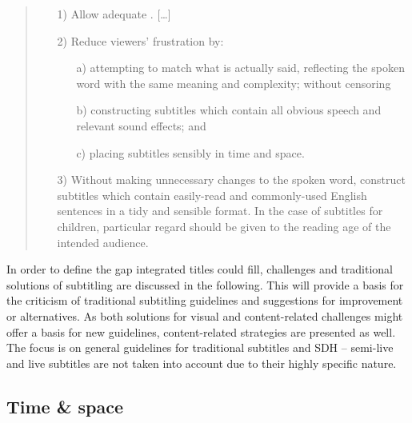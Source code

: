 \begin{quote}
\begin{itemize}
\item[1)] Allow adequate . […]
\item[2)] Reduce viewers' frustration by:
\begin{itemize}
\item[a)] attempting to match what is actually said, reflecting the spoken word with the same meaning and complexity; without censoring
\item[b)] constructing subtitles which contain all obvious speech and relevant sound effects; and
\item[c)] placing subtitles sensibly in time and space.
\end{itemize}
\item[3)] Without making unnecessary changes to the spoken word, construct subtitles which contain easily-read and commonly-used English sentences in a tidy and sensible format. In the case of subtitles for children, particular regard should be given to the reading age of the intended audience.
\end{itemize}
\end{quote}

In order to define the gap integrated titles could fill, challenges and traditional solutions of subtitling are discussed in the following. This will provide a basis for the criticism of traditional subtitling guidelines and suggestions for improvement or alternatives. As both solutions for visual and content-related challenges might offer a basis for new guidelines, content-related strategies are presented as well. The focus is on general guidelines for traditional subtitles and SDH – semi-live and live subtitles are not taken into account due to their highly specific nature.

\subsection{Time \& space}\label{sec:1.2.1}

